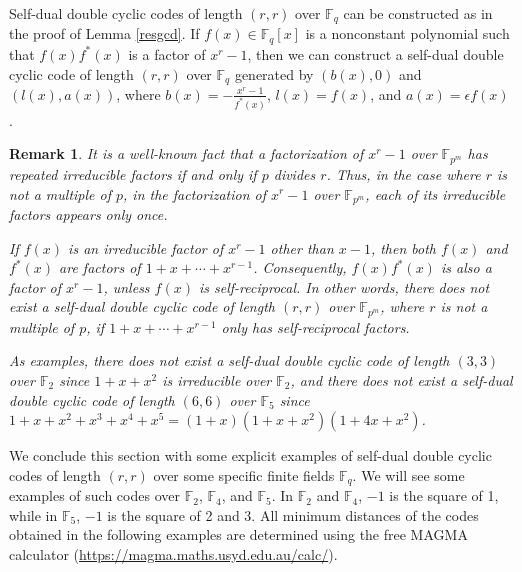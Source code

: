 \documentclass[12pt]{article}
\newtheorem{remark}{Remark}
\begin{document}
	Self-dual double cyclic codes of length $(r,r)$ over $\mathbb{F}_q$ can be constructed as in the proof of Lemma \ref{resgcd}. If $f(x)\in\mathbb{F}_q[x]$ is a nonconstant polynomial such that $f(x)f^{*}(x)$ is a factor of $x^r-1$, then we can construct a self-dual double cyclic code of length $(r,r)$ over $\mathbb{F}_q$ generated by $(b(x),0)$ and $(l(x),a(x))$, where $b(x)=-\frac{x^r-1}{f^{*}(x)}$, $l(x)=f(x)$, and $a(x)=\epsilon f(x)$.
	\begin{remark}
		It is a well-known fact that a factorization of $x^r-1$ over $\mathbb{F}_{p^m}$ has repeated irreducible factors if and only if $p$ divides $r$. Thus, in the case where $r$ is not a multiple of $p$, in the factorization of $x^r-1$ over $\mathbb{F}_{p^m}$, each of its irreducible factors appears only once.
		
		If $f(x)$ is an irreducible factor of $x^r-1$ other than $x-1$, then both $f(x)$ and $f^{*}(x)$ are factors of $1+x+\cdots+x^{r-1}$. Consequently, $f(x)f^{*}(x)$ is also a factor of $x^r-1$, unless $f(x)$ is self-reciprocal. In other words, there does not exist a self-dual double cyclic code of length $(r,r)$ over $\mathbb{F}_{p^m}$, where $r$ is not a multiple of $p$, if $1+x+\cdots+x^{r-1}$ only has self-reciprocal factors.
		
		As examples, there does not exist a self-dual double cyclic code of length $(3,3)$ over $\mathbb{F}_2$ since $1+x+x^2$ is irreducible over $\mathbb{F}_2$, and there does not exist a self-dual double cyclic code of length $(6,6)$ over $\mathbb{F}_5$ since $1+x+x^2+x^3+x^4+x^5=(1+x)(1+x+x^2)(1+4x+x^2)$.
	\end{remark}
	We conclude this section with some explicit examples of self-dual double cyclic codes of length $(r,r)$ over some specific finite fields $\mathbb{F}_q$. We will see some examples of such codes over $\mathbb{F}_2$, $\mathbb{F}_4$, and $\mathbb{F}_5$. In $\mathbb{F}_2$ and $\mathbb{F}_4$, $-1$ is the square of 1, while in $\mathbb{F}_5$, $-1$ is the square of 2 and 3. All minimum distances of the codes obtained in the following examples are determined using the free MAGMA calculator (\url{https://magma.maths.usyd.edu.au/calc/}). 
\end{document}
